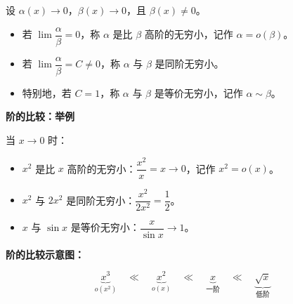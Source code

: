 \documentclass[fontset=fandol]{ctexart}
\newenvironment{custom}[1]{\par\noindent\textbf{#1}\quad}{\par\vspace{0.8em}}
\begin{document}
\begin{definition}[无穷小的阶]

设 \(\alpha(x) \to 0\)，\(\beta(x) \to 0\)，且 \(\beta(x) \neq 0\)。

\begin{itemize}

\item 若 \(\lim \dfrac{\alpha}{\beta} = 0\)，称 \(\alpha\) 是比 \(\beta\) 高阶的无穷小，记作 \(\alpha = o(\beta)\)。

\item 若 \(\lim \dfrac{\alpha}{\beta} = C \neq 0\)，称 \(\alpha\) 与 \(\beta\) 是同阶无穷小。

\item 特别地，若 \(C = 1\)，称 \(\alpha\) 与 \(\beta\) 是等价无穷小，记作 \(\alpha \sim \beta\)。

\end{itemize}

\end{definition}



\begin{custom}{阶的比较：举例}

当 \(x \to 0\) 时：

\begin{itemize}

\item \(x^2\) 是比 \(x\) 高阶的无穷小：\(\dfrac{x^2}{x} = x \to 0\)，记作 \(x^2 = o(x)\)。

\item \(x^2\) 与 \(2x^2\) 是同阶无穷小：\(\dfrac{x^2}{2x^2} = \dfrac{1}{2}\)。

\item \(x\) 与 \(\sin x\) 是等价无穷小：\(\dfrac{x}{\sin x} \to 1\)。

\end{itemize}



\textbf{阶的比较示意图：}

\[

\underbrace{x^3}_{o(x^2)} \quad \ll \quad \underbrace{x^2}_{o(x)} \quad \ll \quad \underbrace{x}_{\text{一阶}} \quad \ll \quad \underbrace{\sqrt{x}}_{\text{低阶}}

\]

\end{custom}



\Needspace{0.62\textheight}
\end{document}
